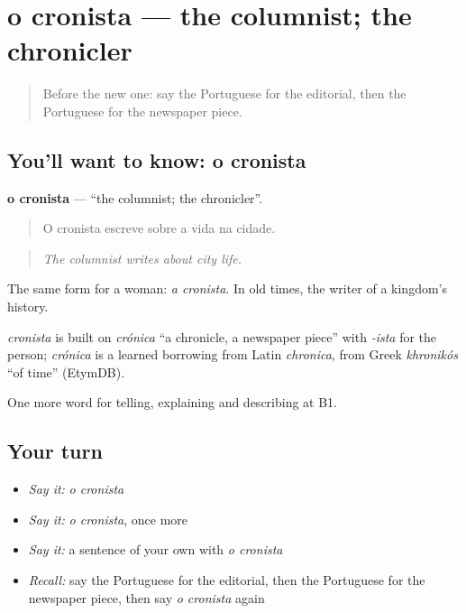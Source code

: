\section[o cronista]{o cronista — the columnist; the chronicler}

\label{lesson:PT-C284-cronista}



\begin{quote}
Before the new one: say the Portuguese for the editorial, then the Portuguese for the newspaper piece.
\end{quote}

\subsection*{You'll want to know: o cronista}
\textbf{o cronista} — \textquotedblleft{}the columnist; the chronicler\textquotedblright{}.

\begin{quote}
O cronista escreve sobre a vida na cidade.
\end{quote}

\begin{quote}
\emph{The columnist writes about city life.}
\end{quote}

The same form for a woman: \emph{a cronista}. In old times, the writer of a kingdom’s history.

\begin{cousinweb}
\emph{cronista} is built on \emph{crónica} \textquotedblleft{}a chronicle, a newspaper piece\textquotedblright{} with \emph{-ista} for the person; \emph{crónica} is a learned borrowing from Latin \emph{chronica}, from Greek \emph{khronikós} \textquotedblleft{}of time\textquotedblright{} (EtymDB).
\end{cousinweb}

\begin{grammarlens}[title={What you've built}]
One more word for telling, explaining and describing at B1.
\end{grammarlens}

\subsection*{Your turn}
\begin{itemize}
\raggedright
  \item \emph{Say it:} \emph{o cronista}
  \item \emph{Say it:} \emph{o cronista}, once more
  \item \emph{Say it:} a sentence of your own with \emph{o cronista}
  \item \emph{Recall:} say the Portuguese for the editorial, then the Portuguese for the newspaper piece, then say \emph{o cronista} again
\end{itemize}

